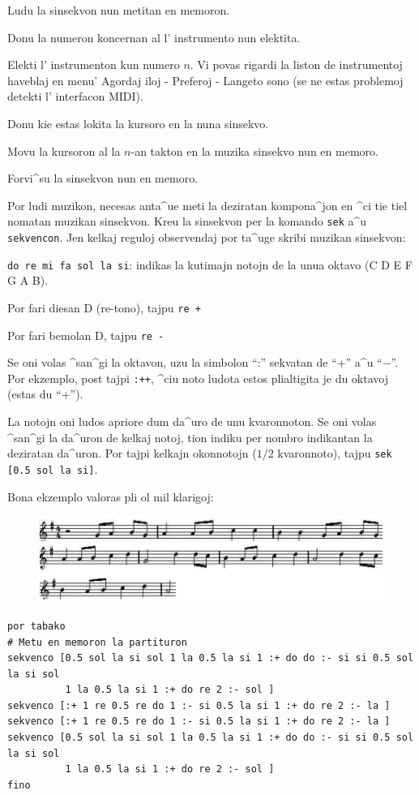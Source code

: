 
Ludu la sinsekvon nun metitan en memoron.


Donu la numeron koncernan al l' instrumento nun elektita.


Elekti l' instrumenton kun numero $n$.  Vi povas rigardi la liston de
instrumentoj haveblaj en menu' Agordaj iloj - Preferoj - Langeto sono
(se ne estas problemoj detekti l' interfacon MIDI).


Donu kie estas lokita la kursoro en la nuna sinsekvo.


Movu la kursoron al la $n$-an takton en la muzika sinsekvo nun en
memoro.


Forvi^su la sinsekvon nun en memoro.

Por ludi muzikon, necesas anta^ue meti la deziratan kompona^jon en ^ci
tie tiel nomatan muzikan sinsekvon.  Kreu la sinsekvon per la komando
\texttt{sek} a^u \texttt{sekvencon}.  Jen kelkaj reguloj observendaj
por ta^uge skribi muzikan sinsekvon:

\texttt{do re mi fa sol la si}: indikas la kutimajn notojn de la unua
oktavo (C D E F G A B).

Por fari diesan D (re-tono), tajpu \texttt{re +}

Por fari bemolan D, tajpu \texttt{re -}

Se oni volas ^san^gi la oktavon, uzu la simbolon ``:'' sekvatan de
``+'' a^u ``$-$''.  Por ekzemplo, post tajpi \texttt{:++}, ^ciu noto
ludota estos plialtigita je du oktavoj (estas du ``+'').

La notojn oni ludos apriore dum da^uro de unu kvaronnoton.  Se oni
volas ^san^gi la da^uron de kelkaj notoj, tion indiku per nombro
indikantan la deziratan da^uron.  Por tajpi kelkajn okonnotojn
(${1}/{2}$ kvaronnoto), tajpu \texttt{sek [0.5 sol la si]}.

Bona ekzemplo valoras pli ol mil klarigoj:
\begin{figure}[h]
\includegraphics{bildoj/partition.png}
\end{figure}
\begin{verbatim}
por tabako
# Metu en memoron la partituron
sekvenco [0.5 sol la si sol 1 la 0.5 la si 1 :+ do do :- si si 0.5 sol la si sol
          1 la 0.5 la si 1 :+ do re 2 :- sol ]
sekvenco [:+ 1 re 0.5 re do 1 :- si 0.5 la si 1 :+ do re 2 :- la ]
sekvenco [:+ 1 re 0.5 re do 1 :- si 0.5 la si 1 :+ do re 2 :- la ]
sekvenco [0.5 sol la si sol 1 la 0.5 la si 1 :+ do do :- si si 0.5 sol la si sol
          1 la 0.5 la si 1 :+ do re 2 :- sol ]
fino
\end{verbatim}

